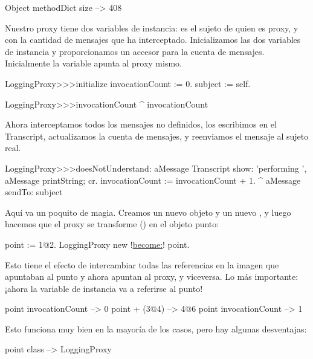 \documentclass[a4paper,10pt,twoside]{book}
\begin{document}
\begin{code}{}
Object methodDict size --> 408
\end{code}

Nuestro proxy tiene dos variables de instancia:  es el
sujeto de quien es proxy, y  con la cantidad de mensajes que
ha interceptado.  Inicializamos las dos variables de instancia y
proporcionamos un accesor para la cuenta de mensajes.  Inicialmente la
variable  apunta al proxy mismo.
\begin{code}{}
LoggingProxy>>>initialize
        invocationCount := 0.
        subject := self.
\end{code}

\begin{code}{}
LoggingProxy>>>invocationCount
        ^ invocationCount
\end{code}

Ahora interceptamos todos los mensajes no definidos, los escribimos en
el Transcript, actualizamos la cuenta de mensajes, y reenviamos el
mensaje al sujeto real.
\begin{code}{}
LoggingProxy>>>doesNotUnderstand: aMessage
        Transcript show: 'performing ', aMessage printString; cr.
        invocationCount := invocationCount + 1.
        ^ aMessage sendTo: subject
\end{code}

Aqu\'i va un poquito de magia.  Creamos un nuevo objeto  y un
nuevo , y luego hacemos que el proxy se transforme
() en el objeto punto:
\begin{code}{}
point := 1@2.
LoggingProxy new !\underline{become:}! point.
\end{code}

Esto tiene el efecto de intercambiar todas las referencias en la
imagen que apuntaban al punto y ahora apuntan al proxy, y viceversa.
Lo m\'as importante: ¡ahora la variable de instancia  va a
referirse al punto!

\begin{code}{}
point invocationCount --> 0
point + (3@4)             --> 4@6
point invocationCount --> 1
\end{code}

Esto funciona muy bien en la mayor\'ia de los casos, pero hay algunas
desventajas: 
\begin{code}{}
point class --> LoggingProxy
\end{code}
\end{document}
